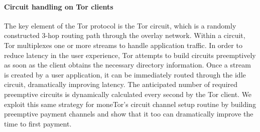 \paragraph*{Circuit handling on Tor clients}
%

The key element of the Tor protocol is the Tor circuit, which is a randomly
constructed 3-hop routing path through the overlay network. Within a circuit,
Tor multiplexes one or more streams to handle application traffic. In order to
reduce latency in the user experience, Tor attempts to build circuits
preemptively as soon as the client obtains the necessary directory information.
Once a stream is created by a user application, it can be immediately routed
through the idle circuit, dramatically improving latency. The anticipated number
of required preemptive circuits is dynamically calculated every second by the
Tor client. We exploit this same strategy for moneTor's circuit channel setup
routine by building preemptive payment channels and show that it too can
dramatically improve the time to first payment.




